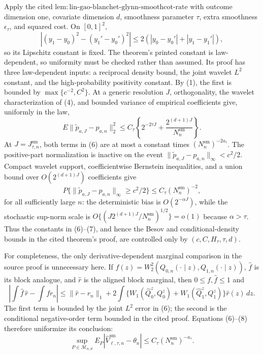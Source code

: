 Apply the cited \(\mathrm{lem{:}lin\text{-}gao\text{-}blanchet\text{-}glynn\text{-}smoothcot\text{-}rate}\) with outcome dimension one, covariate dimension \(d\), smoothness parameter \(\tau\), extra smoothness \(\epsilon_\tau\), and squared cost. On \([0,1]^2\),
\[
|(y_1-y_0)^2-(y_1'-y_0')^2|
\le2(|y_0-y_0'|+|y_1-y_1'|),                                      \tag{5}
\]
so its Lipschitz constant is fixed. The theorem's printed constant is law-dependent, so uniformity must be checked rather than assumed. Its proof has three law-dependent inputs: a reciprocal density bound, the joint wavelet \(L^2\) constant, and the high-probability positivity constant. By (1), the first is bounded by \(\max\{c^{-2},C^2\}\). At a generic resolution \(J\), orthogonality, the wavelet characterization of (4), and bounded variance of empirical coefficients give, uniformly in the law,
\[
E\|\widetilde p_{a,J}-p_{a,n}\|_2^2
\le C_\tau\left\{2^{-2\tau J}+\frac{2^{(d+1)J}}{N_n^{\mathrm{sm}}}\right\}. \tag{6}
\]
At \(J=J_{\tau,n}^{\mathrm{sm}}\), both terms in (6) are at most a constant times \((N_n^{\mathrm{sm}})^{-2a_\tau}\). The positive-part normalization is inactive on the event \(\|\widetilde p_{a,J}-p_{a,n}\|_\infty<c^2/2\). Compact wavelet support, coefficientwise Bernstein inequalities, and a union bound over \(O(2^{(d+1)J})\) coefficients give
\[
P\{\|\widetilde p_{a,J}-p_{a,n}\|_\infty\ge c^2/2\}
\le C_\tau(N_n^{\mathrm{sm}})^{-2},                               \tag{7}
\]
for all sufficiently large \(n\): the deterministic bias is \(O(2^{-\alpha J})\), while the stochastic sup-norm scale is \(O\{(J2^{(d+1)J}/N_n^{\mathrm{sm}})^{1/2}\}=o(1)\) because \(\alpha>\tau\). Thus the constants in (6)--(7), and hence the Besov and conditional-density bounds in the cited theorem's proof, are controlled only by \((c,C,H_\tau,\tau,d)\).

For completeness, the only derivative-dependent marginal comparison in the source proof is unnecessary here. If \(f(z)=W_2^2(Q_{0,n}(\cdot\mid z),Q_{1,n}(\cdot\mid z))\), \(\widehat f\) is its block analogue, and \(\widehat r\) is the aligned block marginal, then \(0\le f,\widehat f\le1\) and
\[
\left|\int\widehat f\,\widehat r-\int f r_n\right|
\le\|\widehat r-r_n\|_1+
2\int\{W_1(\widehat Q_0^z,Q_0^z)+W_1(\widehat Q_1^z,Q_1^z)\}\widehat r(z)\,dz. \tag{8}
\]
The first term is bounded by the joint \(L^2\) error in (6); the second is the conditional negative-order term bounded in the cited proof. Equations (6)--(8) therefore uniformize its conclusion:
\[
\sup_{P\in\mathcal M_{n,d}}
E_P|\widehat V_{\ell,\tau,n}^{\mathrm{sm}}-\theta_n|
\le C_\tau(N_n^{\mathrm{sm}})^{-a_\tau}.                           \tag{9}
\]


